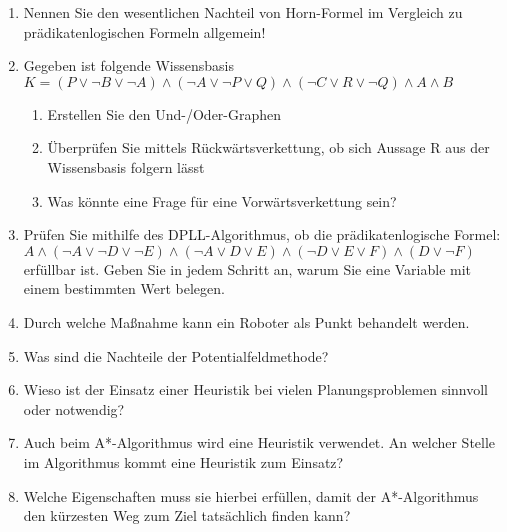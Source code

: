 \begin{enumerate}
	\item Nennen Sie den wesentlichen Nachteil von Horn-Formel im Vergleich zu prädikatenlogischen Formeln allgemein!
	
	\item Gegeben ist folgende Wissensbasis $K=(P \vee \neg B \vee \neg A) \wedge (\neg A \vee \neg P \vee Q) \wedge (\neg C \vee R \vee \neg Q) \wedge A \wedge B$
	
	\begin{enumerate}
		\item Erstellen Sie den Und-/Oder-Graphen
		\item Überprüfen Sie mittels Rückwärtsverkettung, ob sich Aussage R aus der Wissensbasis folgern lässt
		\item Was könnte eine Frage für eine Vorwärtsverkettung sein?
	\end{enumerate}
	
	\item Prüfen Sie mithilfe des DPLL-Algorithmus, ob die prädikatenlogische Formel: $A \wedge (\neg A \vee \neg D \vee \neg E) \wedge (\neg A \vee D \vee E) \wedge (\neg D \vee E \vee F) \wedge (D \vee \neg F)$ erfüllbar ist. Geben Sie in jedem Schritt an, warum Sie eine Variable mit einem bestimmten Wert belegen.
	
	\item Durch welche Maßnahme kann ein Roboter als Punkt behandelt werden.
	
	\item Was sind die Nachteile der Potentialfeldmethode?
	
	\item Wieso ist der Einsatz einer Heuristik bei vielen Planungsproblemen sinnvoll oder notwendig?
	\item Auch beim A*-Algorithmus wird eine Heuristik verwendet. An welcher Stelle im Algorithmus kommt eine Heuristik zum Einsatz?
	\item Welche Eigenschaften muss sie hierbei erfüllen, damit der A*-Algorithmus den kürzesten Weg zum Ziel tatsächlich finden kann?
\end{enumerate}
